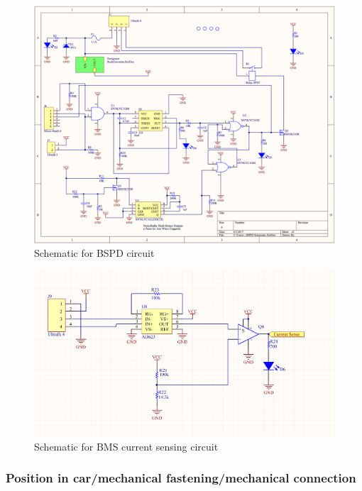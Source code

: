 \documentclass{article}
\begin{document}
  \begin{figure}[H]
        \centering
        \includegraphics[width=\textwidth]{bspd_schematic_rev2.png}
        \caption{Schematic for BSPD circuit}
        \label{fig:bspd_schematic}
  \end{figure}

  \begin{figure}[H]
        \centering
        \includegraphics[width=\textwidth]{BMS_current_sense_schematic.png}
        \caption{Schematic for BMS current sensing circuit}
        \label{fig:bms_current_sense_schematic}
  \end{figure}

\subsubsection{Position in car/mechanical fastening/mechanical connection}
\end{document}
